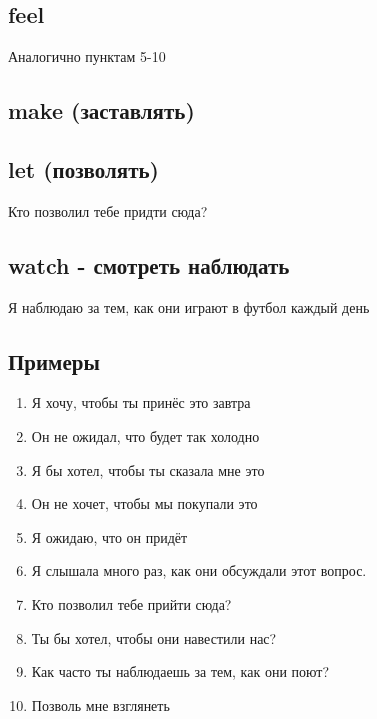 \subsection{feel}
\p
Аналогично пунктам 5-10

\subsection{make (заставлять)}
\p
{}

\subsection{let (позволять)}
\p
Кто позволил тебе придти сюда?\\

\subsection{watch - смотреть наблюдать}
\p
Я наблюдаю за тем, как они играют в футбол каждый день\\

\subsection{Примеры}
\p
\begin{enumerate}
    \item Я хочу, чтобы ты принёс это завтра \\ 
    \item Он не ожидал, что будет так холодно \\ 
    \item Я бы хотел, чтобы ты сказала мне это \\ 
    \item Он не хочет, чтобы мы покупали это \\ 
    \item Я ожидаю, что он придёт \\ 
    \item Я слышала много раз, как они обсуждали этот вопрос. \\ 
    \item Кто позволил тебе прийти сюда? \\ 
    \item Ты бы хотел, чтобы они навестили нас? \\ 
    \item Как часто ты наблюдаешь за тем, как они поют? \\ 
    \item Позволь мне взглянеть \\ 
\end{enumerate}